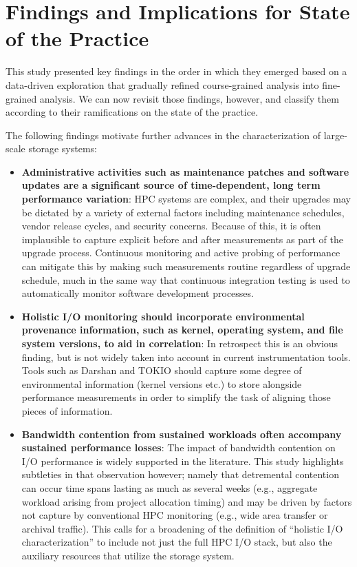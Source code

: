 \section{Findings and Implications for State of the Practice}
\label{sec:findings}

This study presented key findings in the order in which they emerged
based on a data-driven exploration that gradually refined course-grained
analysis into fine-grained analysis.  We can now revisit those findings,
however, and classify them according to their ramifications on the state
of the practice.

The following findings motivate further advances in the characterization of
large-scale storage systems:

\begin{itemize}

\item \textbf{Administrative activities such as maintenance patches and
software updates are a significant source of time-dependent, long term
performance variation}: HPC systems are complex, and their upgrades may be
dictated by a variety of external factors including maintenance schedules,
vendor release cycles, and security concerns.  Because of this, it is often
implausible to capture explicit before and after measurements as part of the
upgrade process.  Continuous monitoring and active probing of performance
can mitigate this by making such measurements routine regardless of upgrade
schedule, much in the same way that continuous integration  testing is used
to automatically monitor software development processes.

\item \textbf{Holistic I/O monitoring should incorporate environmental
provenance information, such as kernel, operating system, and file system
versions, to aid in correlation}: 
In retrospect this is an obvious finding, but is not widely taken into
account in current instrumentation tools.  Tools such as Darshan and
TOKIO should capture some degree of environmental information (kernel
versions etc.) to store alongside performance measurements in order to
simplify the task of aligning those pieces of information.

\item \textbf{Bandwidth contention from sustained workloads often accompany
sustained performance losses}: The impact of bandwidth contention on I/O
performance is widely supported in the literature.  This study highlights
subtleties in that observation however; namely that detremental contention
can occur time spans lasting as much as several weeks (e.g., aggregate
workload arising from project allocation timing) and may be driven by factors 
not capture by conventional HPC monitoring (e.g., wide area transfer or 
archival traffic).  This calls for a broadening of the definition of
``holistic I/O characterization'' to include not just the full HPC I/O
stack, but also the auxiliary resources that utilize the storage system.

\end{itemize}


